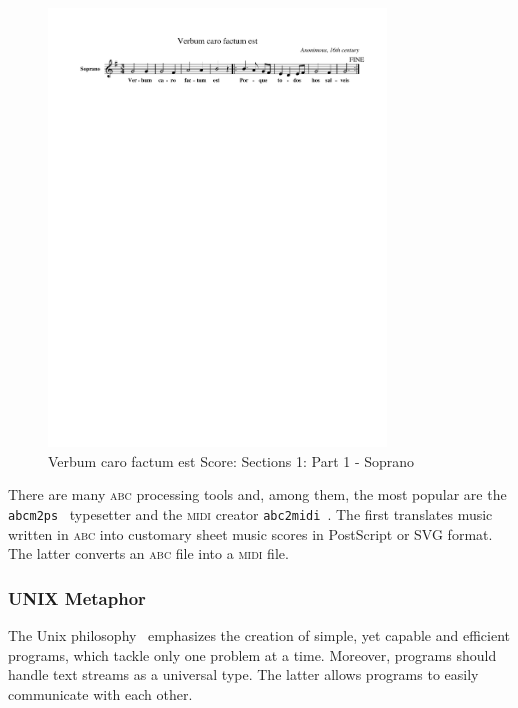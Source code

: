 \documentclass[a4paper,UKenglish]{oasics}
\newcommand{\abc}{\textsc{abc}}
\newcommand{\abcpt}{\abc{} processing tool}
\newcommand{\midi}{\textsc{midi} }
\newcommand{\abcmtops}{\texttt{abcm2ps}}
\newcommand{\abctomidi}{\texttt{abc2midi}}
\begin{document}
\vspace{-0.25cm}
\begin{figure}[htb]
  \centering 
  \includegraphics[width=0.8\textwidth, clip=true, trim = 0mm 230mm 0mm 17mm]{img/101.pdf} 
  \caption{Verbum caro factum est Score: Sections 1: Part 1 - Soprano}
  \label{fig:verbum_s1_p1_score}
\end{figure}

There are many \abcpt{}s and, among them, the most popular are the
\abcmtops{}~\cite{abcm2ps:Online} typesetter and the \midi creator
\abctomidi~\cite{abc2midi:Online}. The first translates music written in \abc{} into customary sheet
music scores in PostScript or SVG format. The latter converts an \abc{} file into a \midi file.

\subsubsection*{UNIX Metaphor}

The Unix philosophy~\cite{raymond2004art} emphasizes the creation of simple, yet capable and
efficient programs, which tackle only one problem at a time. Moreover, programs should handle text
streams as a universal type. The latter allows programs to easily communicate with each other.
\end{document}
